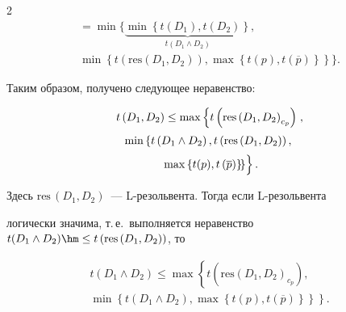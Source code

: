 \begin{multicols}{2}
\begin{multline*}
  {}= \min\Bigg\{


  \underbrace{\min\left\{ t(D_1), t(D_2)\right\}}_{t(D_1\wedge D_2)},\\[2pt]


   \min\left\{ 


t\left(\mathrm{res}\left(D_1, D_2\right)\right), \max\left\{t(p), t(\overline{p})\right\}\right\}


  \Bigg\}.


  \end{multline*}


  


  Таким образом, получено следующее не\-ра\-вен\-ство:


  \begin{multline*}


  t\left(D_1, D_2\right) \leq \max\left\{ t\left( \mathrm{res}\left(D_1, D_2\right)_{c_p}\right)\right.,\\[2pt]


 \min \left\{ t\left(D_1\wedge D_2\right), t\left(\mathrm{res}\left(D_1,D_2\right)\right),\right.\\[2pt]


\left.   \left. \max \left\{ t(p), 


t\left(\overline{p}\right)\right\}\!\right\}\!


\vphantom{\left( \mathrm{res}\left(D_1, D_2\right)_{c_p}\right)}


\right\}.


 \end{multline*}


 


 \noindent


  Здесь $\mathrm{res}\,(D_1, D_2)$~--- \mbox{L-ре}\-золь\-вен\-та. Тогда если \mbox{L-ре}\-золь\-ве\-нта 


логически значима, т.\,е.\ выполняется неравенство $t(D_1\wedge D_2) \hm\leq 


t\left( \mathrm{res}\,(D_1, D_2)\right)$, то


  \begin{multline*}


  t(D_1\wedge D_2) \leq \max \left\{ t\left( \mathrm{res}\left (D_1,D_2\right)_{c_p}\right),\right.\\


\left.  \min \left\{ 


t(D_1\wedge D_2), \max \left\{ t(p), t(\overline{p})\right\}\right\}\right\}.



\end{multline*}
\end{multicols}
